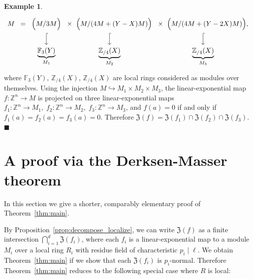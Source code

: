 \documentclass[letterpaper, 11pt, thm-restate]{article}
\numberwithin{equation}{section}
\newcommand{\Z}{\mathbb{Z}}
\newcommand{\F}{\mathbb{F}}
\newcommand{\mZ}{\mathfrak{Z}}
\theoremstyle{definition}
\theoremstyle{definition}
\newtheorem{example}[theorem]{Example}
\theoremstyle{definition}
\begin{document}
\begin{example}
    \[
    \begin{tikzcd}[column sep=0mm]
    M \;\; = & \Big(M/3M\Big) \arrow[d, hook] & \times \;\; \Big(M/(4M+(Y-X)M)\Big) \arrow[d, hook] & \times \;\; \Big(M/(4M+(Y-2X)M)\Big), \arrow[d, hook] \\
    & \underbrace{\F_3(Y)}_{M_1} & \underbrace{\Z_{/4}(X)}_{M_2} & \underbrace{\Z_{/4}(X)}_{M_3}
    \end{tikzcd}
    \]
    where $\F_3(Y)$, $\Z_{/4}(X)$, $\Z_{/4}(X)$ are local rings considered as modules over themselves.
    Using the injection $M \hookrightarrow M_1 \times M_2 \times M_3$, the linear-exponential map $f\colon \Z^n \rightarrow M$ is projected on three linear-exponential maps $f_1 \colon \Z^n \rightarrow M_1,\; f_2 \colon \Z^n \rightarrow M_2,\; f_3 \colon \Z^n \rightarrow M_3$, and $f(a)=0$ if and only if $f_1(a) = f_2(a) = f_3(a) = 0$.
    Therefore $\mZ(f) = \mZ(f_1) \cap \mZ(f_2) \cap \mZ(f_3)$.
    \hfill $\blacksquare$
\end{example}

\section{A proof via the Derksen-Masser theorem}\label{sec:short_proof}
In this section we give a shorter, comparably elementary proof of Theorem~\ref{thm:main}.
\thmmain*

By Proposition~\ref{prop:decompose_localize}, we can write $\mZ(f)$ as a finite intersection $\bigcap_{i = 1}^d \mZ(f_i)$, where each $f_i$ is a linear-exponential map to a module $M_i$ over a local ring $R_i$ with residue field of characteristic $p_i \mid \ell$.
We obtain Theorem~\ref{thm:main} if we show that each $\mZ(f_i)$ is $p_i$-normal.
Therefore Theorem~\ref{thm:main} reduces to the following special case where $R$ is local:
\end{document}
